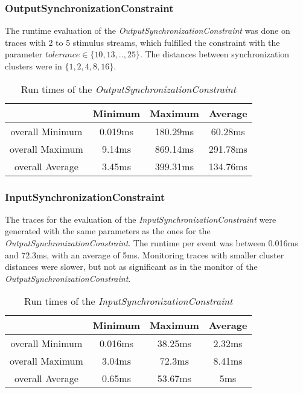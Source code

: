 \subsubsection{OutputSynchronizationConstraint}
The runtime evaluation of the \textit{OutputSynchronizationConstraint} was done on traces with 2 to 5 stimulus streams, which fulfilled the constraint with the parameter $tolerance\in\{10,13,.., 25\}$. The distances between synchronization clusters were in $\{1,2,4,8, 16\}$. 
\begin{table}
	\begin{tabular}{|c|c|c|c|}
		\hline
						& Minimum &  Maximum &  Average \\
		\hline
		overall Minimum & 0.019ms & 180.29ms & 60.28ms\\
		\hline
		overall Maximum & 9.14ms & 869.14ms & 291.78ms\\
		\hline
		overall Average & 3.45ms & 399.31ms & 134.76ms\\
		\hline
	\end{tabular}
	\centering
	\caption{Run times of the \textit{OutputSynchronizationConstraint}}
	\label{tab:runtimeOutputSynchronizationConstraint}
\end{table}

\subsubsection{InputSynchronizationConstraint}
The traces for the evaluation of the \textit{InputSynchronizationConstraint} were generated with the same parameters as the ones for the \textit{OutputSynchronizationConstraint}. The runtime per event was between 0.016ms and 72.3ms, with an average of 5ms. Monitoring traces with smaller cluster distances were slower, %
but not as significant as in the monitor of the \textit{OutputSynchronizationConstraint}.%
\begin{table}
	\begin{tabular}{|c|c|c|c|}
		\hline
		& Minimum &  Maximum &  Average \\
		\hline
		overall Minimum & 0.016ms & 38.25ms & 2.32ms\\
		\hline
		overall Maximum & 3.04ms & 72.3ms & 8.41ms\\
		\hline
		overall Average & 0.65ms & 53.67ms & 5ms\\
		\hline
	\end{tabular}
	\centering
	\caption{Run times of the \textit{InputSynchronizationConstraint}}
	\label{tab:runtimeInputSynchronizationConstraint}
\end{table}